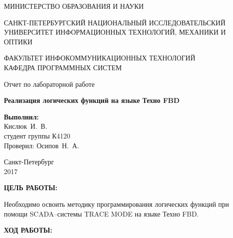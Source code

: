 \documentclass[14pt,a4paper]{extreport}
\newcommand{\header}[1]{%
{
\clearpage%
\fontsize{16pt}{14pt}\selectfont
\begin{center}
\textbf{\MakeUppercase{#1}:}
\end{center}
}
}
\newcommand{\labyear}{2017}
\newcommand{\labtitle}{Реализация логических функций на языке Техно FBD}
\newcommand{\prepod}{Осипов~Н.~А.}
\newcommand{\student}{Кислюк~И.~В.}
\begin{document}
	\begin{titlepage}
	\begin{center}	
		\fontsize{14pt}{14pt}\selectfont
		МИНИСТЕРСТВО ОБРАЗОВАНИЯ И НАУКИ\\

		\vspace*{0.6\baselineskip}

		\MakeUppercase{Санкт-Петербургский Национальный Исследовательский Университет Информационных технологий, механики и оптики}		
		
		\vspace*{0.6\baselineskip}
		\MakeUppercase{Факультет Инфокоммуникационных технологий}\\
		\MakeUppercase{Кафедра программных систем}
	
		\vspace*{7\baselineskip}
		\fontsize{19pt}{18pt}\selectfont
		Отчет по лабораторной работе
		
		\fontsize{20pt}{18pt}\selectfont
		\textbf{\labtitle}\\
		\vspace*{1.15\baselineskip}
		\end{center}
	
	\vspace*{2\baselineskip}
	\begin{flushright}
	\fontsize{14pt}{14pt}\selectfont
	\textbf{Выполнил:}\\
	\student\\
	студент группы К4120\\
	Проверил: \prepod\\
	\end{flushright}
	
	\vspace{\fill}
	\begin{center}
	Санкт-Петербург\\
	\vspace{-1ex}
	\labyear
	\end{center}
	
\end{titlepage}

\fontsize{14pt}{14pt}\selectfont

\header{Цель работы}


Необходимо освоить методику программирования логических функций при помощи SCADA--системы TRACE MODE на языке Техно FBD.

\header{Ход работы}
\end{document}
